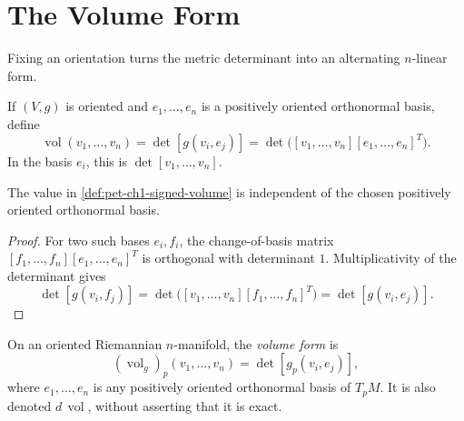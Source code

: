 \section{The Volume Form}

Fixing an orientation turns the metric determinant into an alternating
$n$-linear form.

\begin{definition}
  \label{def:pet-ch1-signed-volume}


  If $(V,g)$ is oriented and $e_1,\ldots,e_n$ is a positively oriented
  orthonormal basis, define
  \[
    \operatorname{vol}(v_1,\ldots,v_n)
      =\det[g(v_i,e_j)]
      =\det\big([v_1,\ldots,v_n][e_1,\ldots,e_n]^T\big).
  \]
  In the basis $e_i$, this is $\det[v_1,\ldots,v_n]$.
\end{definition}

\begin{proposition}
  \label{prop:pet-ch1-signed-volume-basis-independent}


  The value in \cref{def:pet-ch1-signed-volume} is independent of the chosen
  positively oriented orthonormal basis.
\end{proposition}
\begin{proof}

  \sketch
  For two such bases $e_i,f_i$, the change-of-basis matrix
  $[f_1,\ldots,f_n][e_1,\ldots,e_n]^T$ is orthogonal with determinant $1$.
  Multiplicativity of the determinant gives
  \[
    \det[g(v_i,f_j)]
      =\det\big([v_1,\ldots,v_n][f_1,\ldots,f_n]^T\big)
      =\det[g(v_i,e_j)].
  \]
\end{proof}

\begin{definition}
  \label{def:pet-ch1-volume-form-oriented}


  On an oriented Riemannian $n$-manifold, the \emph{volume form} is
  \[
    (\operatorname{vol}_g)_p(v_1,\ldots,v_n)=\det[g_p(v_i,e_j)],
  \]
  where $e_1,\ldots,e_n$ is any positively oriented orthonormal basis of
  $T_pM$. It is also denoted $d\,\operatorname{vol}$, without asserting that
  it is exact.
\end{definition}

